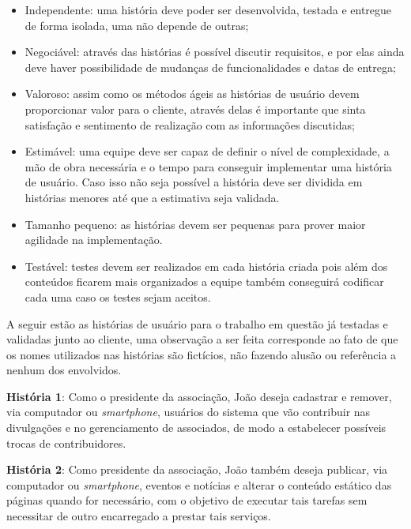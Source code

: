 \begin{itemize}
 \item Independente: uma história deve poder ser desenvolvida, testada e entregue de forma isolada, uma não depende de outras;
 
 \item Negociável: através das histórias é possível discutir requisitos, e por elas ainda deve haver possibilidade de mudanças de funcionalidades e datas de entrega; 
 
 \item Valoroso: assim como os métodos ágeis as histórias de usuário devem proporcionar valor para o cliente, através delas é importante que sinta satisfação e sentimento de realização com as informações discutidas;
 
 \item Estimável: uma equipe deve ser capaz de definir o nível de complexidade, a mão de obra necessária e o tempo para conseguir implementar uma história de usuário. Caso isso não seja possível a história deve ser dividida em histórias menores até que a estimativa seja validada.
 
 \item Tamanho pequeno: as histórias devem ser pequenas para prover maior agilidade na implementação.
 
 \item Testável: testes devem ser realizados em cada história criada pois além dos conteúdos ficarem mais organizados a equipe também conseguirá codificar cada uma caso os testes sejam aceitos.
 
\end{itemize}

A seguir estão as histórias de usuário para o trabalho em questão já testadas e validadas junto ao cliente, uma observação a ser feita corresponde ao fato de que os nomes utilizados nas histórias são fictícios, não fazendo alusão ou referência a nenhum dos envolvidos.

\textbf{História 1}: Como o presidente da associação, João deseja cadastrar e remover, via computador ou \textit{smartphone}, usuários do sistema que vão contribuir nas divulgações e no gerenciamento de associados, de modo a estabelecer possíveis trocas de contribuidores.

\textbf{História 2}: Como presidente da associação, João também deseja publicar, via computador ou \textit{smartphone}, eventos e notícias e alterar o conteúdo estático das páginas quando for necessário, com o objetivo de executar tais tarefas sem necessitar de outro encarregado a prestar tais serviços.

